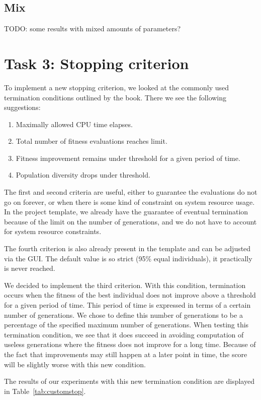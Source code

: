 \documentclass{report}
\begin{document}
\subsection{Mix}
TODO: some results with mixed amounts of parameters?


\newpage

\section{Task 3: Stopping criterion}
To implement a new stopping criterion, we looked at the commonly used termination conditions outlined by the book. There we see the following suggestions:
\begin{enumerate}
	\item Maximally allowed CPU time elapses.
	\item Total number of fitness evaluations reaches limit.
	\item Fitness improvement remains under threshold for a given period of time.
	\item Population diversity drops under threshold.
\end{enumerate}
The first and second criteria are useful, either to guarantee the evaluations do not go on forever, or when there is some kind of constraint on system resource usage. In the project template, we already have the guarantee of eventual termination because of the limit on the number of generations, and we do not have to account for system resource constraints.

The fourth criterion is also already present in the template and can be adjusted via the GUI. The default value is so strict (95\% equal individuals), it practically is never reached.

We decided to implement the third criterion. With this condition, termination occurs when the fitness of the best individual does not improve above a threshold for a given period of time. This period of time is expressed in terms of a certain number of generations. We chose to define this number of generations to be a percentage of the specified maximum number of generations. When testing this termination condition, we see that it does succeed in avoiding computation of useless generations where the fitness does not improve for a long time. Because of the fact that improvements may still happen at a later point in time, the score will be slightly worse with this new condition.
	
The results of our experiments with this new termination condition are displayed in Table~\ref{tab:customstop}.
\end{document}
